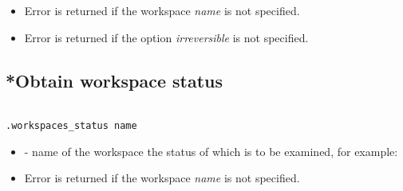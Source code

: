 \errheader
\begin{itemize}

   \item Error  is returned if the workspace \textit{name} is
         not specified.

   \item Error  is returned if the option \textit{irreversible} is
         not specified.

\end{itemize}


\subsection{*Obtain workspace status}

\begin{lstlisting}[style=CommandLineStyle, showlines=true]

.workspaces_status name

\end{lstlisting}

\paramsheader
\begin{itemize}

  \item {} - name of the workspace the status of which is to be
        examined, for example:

\end{itemize}

\errheader
\begin{itemize}
   \item Error  is returned if the workspace \textit{name} is
         not specified.
\end{itemize}

